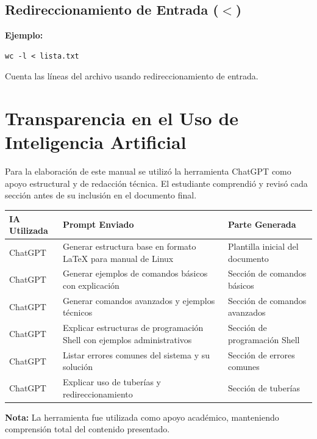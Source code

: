 \documentclass[12pt,a4paper]{article}
\begin{document}
\subsection{Redireccionamiento de Entrada ($<$)}

\textbf{Ejemplo:}
\begin{lstlisting}
wc -l < lista.txt
\end{lstlisting}
Cuenta las líneas del archivo usando redireccionamiento de entrada.

\section{Transparencia en el Uso de Inteligencia Artificial}

Para la elaboración de este manual se utilizó la herramienta ChatGPT como apoyo estructural y de redacción técnica. 
El estudiante comprendió y revisó cada sección antes de su inclusión en el documento final.

\begin{longtable}{|p{3cm}|p{5cm}|p{5cm}|}
\hline
\textbf{IA Utilizada} & \textbf{Prompt Enviado} & \textbf{Parte Generada} \\ \hline

ChatGPT & Generar estructura base en formato LaTeX para manual de Linux & Plantilla inicial del documento \\ \hline

ChatGPT & Generar ejemplos de comandos básicos con explicación & Sección de comandos básicos \\ \hline

ChatGPT & Generar comandos avanzados y ejemplos técnicos & Sección de comandos avanzados \\ \hline

ChatGPT & Explicar estructuras de programación Shell con ejemplos administrativos & Sección de programación Shell \\ \hline

ChatGPT & Listar errores comunes del sistema y su solución & Sección de errores comunes \\ \hline

ChatGPT & Explicar uso de tuberías y redireccionamiento & Sección de tuberías \\ \hline

\end{longtable}

\textbf{Nota:} La herramienta fue utilizada como apoyo académico, manteniendo comprensión total del contenido presentado.
\end{document}
